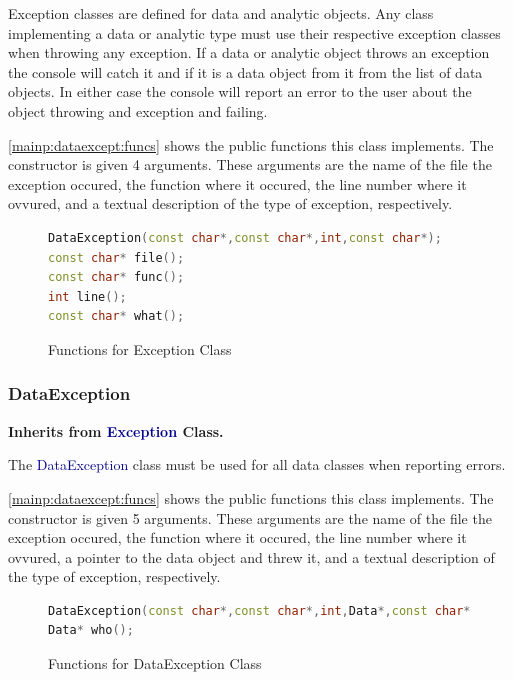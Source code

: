 \documentclass[10pt]{article}
\providecommand{\h}[1]{\textcolor{darkblue}{#1}}
\begin{document}
Exception classes are defined for data and analytic objects. Any class 
implementing a data or analytic type must use their respective exception 
classes when throwing any exception. If a data or analytic object throws an 
exception the console will catch it and if it is a data object from it from the 
list of data objects. In either case the console will report an error to the 
user about the object throwing and exception and failing.

\autoref{mainp:dataexcept:funcs} shows the public functions this class 
implements. The constructor is given 4 arguments. These arguments are the name 
of the file the exception occured, the function where it occured, the line 
number where it ovvured, and a textual description of the type of exception, 
respectively.

\begin{figure}[H]
\begin{mdframed}[style=functions]
\begin{lstlisting}[language=C++]
DataException(const char*,const char*,int,const char*);
const char* file();
const char* func();
int line();
const char* what();
\end{lstlisting}
\end{mdframed}
\caption{Functions for Exception Class}
\label{mainp:except:funcs}
\end{figure}

\subsubsection{DataException}

\textbf{Inherits from \h{Exception} Class.}

The \h{DataException} class must be used for all data classes when reporting 
errors.

\autoref{mainp:dataexcept:funcs} shows the public functions this class 
implements. The constructor is given 5 arguments. These arguments are the name 
of the file the exception occured, the function where it occured, the line 
number where it ovvured, a pointer to the data object and threw it, and a 
textual description of the type of exception, respectively.

\begin{figure}[H]
\begin{mdframed}[style=functions]
\begin{lstlisting}[language=C++]
DataException(const char*,const char*,int,Data*,const char*);
Data* who();
\end{lstlisting}
\end{mdframed}
\caption{Functions for DataException Class}
\label{mainp:dataexcept:funcs}
\end{figure}
\end{document}
